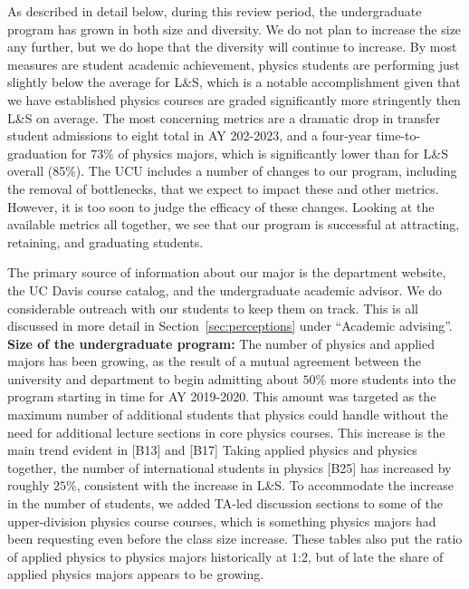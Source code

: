 \documentclass[12pt]{article}
\begin{document}
\noindent
As described in detail below, during this review period, the
undergraduate program has grown in both size and diversity.  We do not
plan to increase the size any further, but we do hope that the
diversity will continue to increase.  By most measures are student
academic achievement, physics students are performing just slightly
below the average for L\&S, which is a notable accomplishment given
that we have established physics courses are graded significantly more
stringently then L\&S on average.  The most concerning metrics are a
dramatic drop in transfer student admissions to eight total in AY
202-2023, and a four-year time-to-graduation for $73\%$ of physics
majors, which is significantly lower than for L\&S overall (85\%).
The UCU includes a number of changes to our program, including the
removal of bottlenecks, that we expect to impact these and other
metrics.  However, it is too soon to judge the efficacy of these
changes.  Looking at the available metrics all together, we see that
our program is successful at attracting, retaining, and graduating
students.

The primary source of information about our major is the department
website, the UC Davis course catalog, and the undergraduate academic
advisor.  We do considerable outreach with our students to keep them
on track.  This is all discussed in more detail in
Section~\ref{sec:perceptions} under ``Academic advising''.\\[3pt]

\noindent
{\bf Size of the undergraduate program:} The number of physics and
applied majors has been growing, as the result of a mutual agreement
between the university and department to begin admitting about $50\%$
more students into the program starting in time for AY 2019-2020.
This amount was targeted as the maximum number of additional students
that physics could handle without the need for additional lecture
sections in core physics courses.  This increase is the main trend
evident in [B13] and [B17] Taking applied physics and physics
together, the number of international students in physics [B25] has
increased by roughly $25\%$, consistent with the increase in L\&S.  To
accommodate the increase in the number of students, we added TA-led
discussion sections to some of the upper-division physics course
courses, which is something physics majors had been requesting even
before the class size increase.  These tables also put the ratio of
applied physics to physics majors historically at 1:2, but of late the
share of applied physics majors appears to be growing.\\[3pt]
\end{document}
